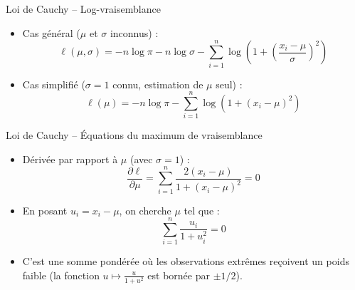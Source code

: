 \documentclass[11pt,aspectratio=169]{beamer}
\begin{document}
\begin{frame}{Loi de Cauchy -- Log-vraisemblance}

\begin{itemize}

\item Cas général ($\mu$ et $\sigma$ inconnus) :
  \[
  \ell(\mu, \sigma) = -n\log\pi - n\log\sigma - \sum_{i=1}^n \log\left(1 + \left(\frac{x_i - \mu}{\sigma}\right)^2\right)
  \]

\item Cas simplifié ($\sigma = 1$ connu, estimation de $\mu$ seul) :
  \[
  \ell(\mu) = -n\log\pi - \sum_{i=1}^n \log\left(1 + (x_i - \mu)^2\right)
  \]

\end{itemize}

\end{frame}

\begin{frame}{Loi de Cauchy -- Équations du maximum de vraisemblance}

\begin{itemize}

\item Dérivée par rapport à $\mu$ (avec $\sigma = 1$) :
  \[
  \frac{\partial \ell}{\partial \mu} = \sum_{i=1}^n \frac{2(x_i - \mu)}{1 + (x_i - \mu)^2} = 0
  \]

\item En posant $u_i = x_i - \mu$, on cherche $\mu$ tel que :
  \[
  \sum_{i=1}^n \frac{u_i}{1 + u_i^2} = 0
  \]

\item C'est une somme pondérée où les observations extrêmes reçoivent un poids faible (la fonction $u \mapsto \frac{u}{1+u^2}$ est bornée par $\pm 1/2$).

\end{itemize}

\end{frame}
\end{document}

